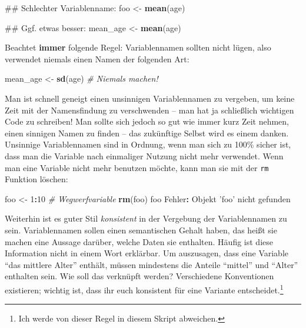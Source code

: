 \documentclass[12pt,]{tufte-book}
\newenvironment{Shaded}{\begin{snugshade}}{\end{snugshade}}
\newcommand{\KeywordTok}[1]{\textcolor[rgb]{0.13,0.29,0.53}{\textbf{#1}}}
\newcommand{\DecValTok}[1]{\textcolor[rgb]{0.00,0.00,0.81}{#1}}
\newcommand{\StringTok}[1]{\textcolor[rgb]{0.31,0.60,0.02}{#1}}
\newcommand{\CommentTok}[1]{\textcolor[rgb]{0.56,0.35,0.01}{\textit{#1}}}
\newcommand{\OperatorTok}[1]{\textcolor[rgb]{0.81,0.36,0.00}{\textbf{#1}}}
\newcommand{\NormalTok}[1]{#1}
\theoremstyle{definition}
\theoremstyle{definition}
\theoremstyle{definition}
\theoremstyle{remark}
\begin{document}
\begin{Shaded}
\begin{Highlighting}[]
\NormalTok{## Schlechter Variablenname:}
\NormalTok{foo <-}\StringTok{ }\KeywordTok{mean}\NormalTok{(age)}

\NormalTok{## Ggf. etwas besser:}
\NormalTok{mean_age <-}\StringTok{ }\KeywordTok{mean}\NormalTok{(age)}
\end{Highlighting}
\end{Shaded}

Beachtet \textbf{immer} folgende Regel: Variablennamen sollten nicht
lügen, also verwendet niemals einen Namen der folgenden Art:

\begin{Shaded}
\begin{Highlighting}[]
\NormalTok{mean_age <-}\StringTok{ }\KeywordTok{sd}\NormalTok{(age) }\CommentTok{# Niemals machen!}
\end{Highlighting}
\end{Shaded}

Man ist schnell geneigt einen unsinnigen Variablennamen zu vergeben, um
keine Zeit mit der Namensfindung zu verschwenden -- man hat ja
schließlich wichtigen Code zu schreiben! Man sollte sich jedoch so gut
wie immer kurz Zeit nehmen, einen sinnigen Namen zu finden -- das
zukünftige Selbst wird es einem danken. Unsinnige Variablennamen sind in
Ordnung, wenn man sich zu 100\% sicher ist, dass man die Variable nach
einmaliger Nutzung nicht mehr verwendet. Wenn man eine Variable nicht
mehr benutzen möchte, kann man sie mit der \texttt{rm} Funktion löschen:

\begin{Shaded}
\begin{Highlighting}[]
\NormalTok{foo <-}\StringTok{ }\DecValTok{1}\OperatorTok{:}\DecValTok{10} \CommentTok{# Wegwerfvariable}
\KeywordTok{rm}\NormalTok{(foo)}
\NormalTok{foo}
\NormalTok{Fehler}\OperatorTok{:}\StringTok{ }\NormalTok{Objekt }\StringTok{'foo'}\NormalTok{ nicht gefunden}
\end{Highlighting}
\end{Shaded}

Weiterhin ist es guter Stil \emph{konsistent} in der Vergebung der
Variablennamen zu sein. Variablennamen sollen einen semantischen Gehalt
haben, das heißt sie machen eine Aussage darüber, welche Daten sie
enthalten. Häufig ist diese Information nicht in einem Wort erklärbar.
Um auszusagen, dass eine Variable ``das mittlere Alter'' enthält, müssen
mindestens die Anteile ``mittel'' und ``Alter'' enthalten sein. Wie soll
das verknüpft werden? Verschiedene Konventionen existieren; wichtig ist,
dass ihr euch konsistent für eine Variante entscheidet.\footnote{Ich
  werde von dieser Regel in diesem Skript abweichen.}
\end{document}
